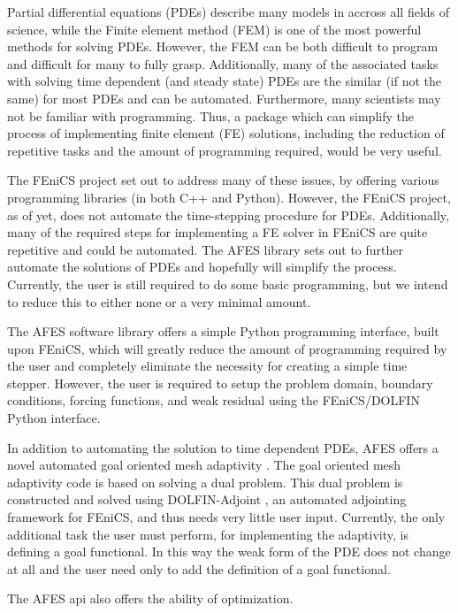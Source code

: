 Partial differential equations (PDEs) describe many models in accross all fields
of science, while the Finite element method (FEM) is one of the most powerful
methods for solving PDEs. However, the FEM can be both difficult to program and
difficult for many to fully grasp. Additionally, many of the associated tasks
with solving time dependent (and steady state) PDEs are the similar (if not the
same) for most PDEs and can be automated. Furthermore, many scientists may
not be familiar with programming. Thus, a package which can simplify the
process of implementing finite element (FE) solutions, including the reduction
of repetitive tasks and the amount of programming required, would be very useful.

The FEniCS project\cite{Alnae2011} set out to address many of these issues, by
offering various programming libraries (in both C++ and Python). However, the
FEniCS project, as of yet, does not automate the time-stepping procedure for
PDEs. Additionally, many of the required steps for implementing a FE solver in
FEniCS are quite repetitive and could be automated. The AFES library sets out to
further automate the solutions of PDEs and hopefully will simplify the process.
Currently, the user is still required to do some basic programming, but we
intend to reduce this to either none or a very minimal amount.

The AFES software library offers a simple Python programming interface, built
upon FEniCS, which will greatly reduce the amount of programming required by the
user and completely eliminate the necessity for creating a simple time stepper.
However, the user is required to setup the problem domain, boundary conditions,
forcing functions, and weak residual using the FEniCS/DOLFIN Python interface.

In addition to automating the solution to time dependent PDEs, AFES offers a
novel automated goal oriented mesh adaptivity \cite{Foster2014e, Jansson2014a,
Jansson2014b}.  The goal oriented mesh adaptivity code is based on solving a
dual problem.  This dual problem is constructed and solved using DOLFIN-Adjoint
\cite{Ham2012, Ferrell2014}, an automated adjointing framework for FEniCS, and
thus needs very little user input.  Currently, the only additional task the user
must perform, for implementing the adaptivity, is defining a goal functional.
In this way the weak form of the PDE does not change at all and the user need
only to add the definition of a goal functional.

The AFES api also offers the ability of optimization.
